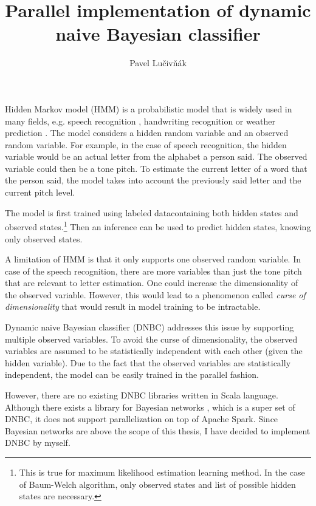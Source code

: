 \documentclass[thesis=B,english]{FITthesis}[2012/06/26]
\title{Parallel implementation of dynamic naive Bayesian classifier}
\author{Pavel Lučivňák} %
\begin{document}

\begin{introduction}
Hidden Markov model (HMM) is a probabilistic model that is widely used in many fields, e.g. speech recognition \cite{hmm-lawrence}, handwriting recognition \cite{hmm-handwriting} or weather prediction \cite{hmm-weather}. The model considers a hidden random variable and an observed random variable. For example, in the case of speech recognition, the hidden variable would be an actual letter from the alphabet a person said. The observed variable could then be a tone pitch. To estimate the current letter of a word that the person said, the model takes into account the previously said letter and the current pitch level.

The model is first trained using labeled data\textemdash containing both hidden states and observed states.\footnote{This is true for maximum likelihood estimation learning method. In the case of Baum-Welch algorithm, only observed states and list of possible hidden states are necessary.} Then an inference can be used to predict hidden states, knowing only observed states.

A limitation of HMM is that it only supports one observed random variable. In case of the speech recognition, there are more variables than just the tone pitch that are relevant to letter estimation. One could increase the dimensionality of the observed variable. However, this would lead to a phenomenon called \textit{curse of dimensionality} that would result in model training to be intractable.

Dynamic naive Bayesian classifier (DNBC) addresses this issue by supporting multiple observed variables. To avoid the curse of dimensionality, the observed variables are assumed to be statistically independent with each other (given the hidden variable). Due to the fact that the observed variables are statistically independent, the model can be easily trained in the parallel fashion.

However, there are no existing DNBC libraries written in Scala language. Although there exists a library for Bayesian networks \cite{bayesian-networks}, which is a super set of DNBC, it does not support parallelization on top of Apache Spark. Since Bayesian networks are above the scope of this thesis, I have decided to implement DNBC by myself.


\end{introduction}
\end{document}
